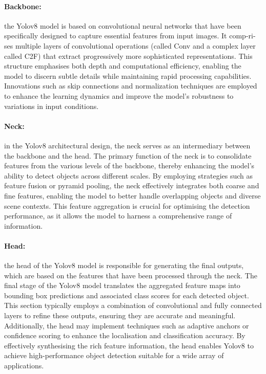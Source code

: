 \paragraph{Backbone:}\label{par:backbone}
the Yolov8 model is based on convolutional neural networks that have been specifically designed to capture essential features from input images.
It comp-ri-ses multiple layers of convolutional operations (called Conv and a complex layer called C2F)
that extract progressively more sophisticated representations.
This structure emphasises both depth and computational efficiency,
enabling the model to discern subtle details while maintaining rapid processing capabilities.
Innovations such as skip connections and normalization techniques are employed to enhance the learning dynamics and improve the model's robustness to variations in input conditions.

\paragraph{Neck:}\label{par:neck}
in the Yolov8 architectural design, the neck serves as an intermediary between the backbone and the head.
The primary function of the neck is to consolidate features from the various levels of the backbone,
thereby enhancing the model's ability to detect objects across different scales.
By employing strategies such as feature fusion or pyramid pooling,
the neck effectively integrates both coarse and fine features,
enabling the model to better handle overlapping objects and diverse scene contexts.
This feature aggregation is crucial for optimising the detection performance,
as it allows the model to harness a comprehensive range of information.


\paragraph{Head:}\label{par:head}
the head of the Yolov8 model is responsible for generating the final outputs,
which are based on the features that have been processed through the neck.
The final stage of the Yolov8 model translates the aggregated feature maps into bounding box predictions and associated class scores for each detected object.
This section typically employs a combination of convolutional and fully connected layers to refine these outputs,
ensuring they are accurate and meaningful.
Additionally, the head may implement techniques such as adaptive anchors or
confidence scoring to enhance the localisation and classification accuracy.
By effectively synthesising the rich feature information, the head enables Yolov8 to achieve high-performance object detection suitable for a wide array of applications.

